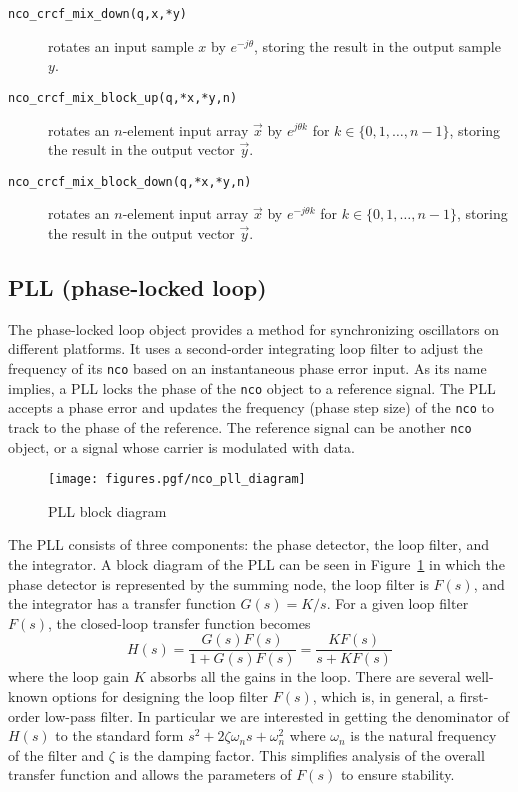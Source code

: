 \begin{description}
\item[{\tt nco\_crcf\_mix\_down(q,x,*y)}]
    rotates an input sample $x$ by $e^{-j\theta}$, storing the result in
    the output sample $y$.
\item[{\tt nco\_crcf\_mix\_block\_up(q,*x,*y,n)}]
    rotates an $n$-element input array $\vec{x}$ by $e^{j\theta k}$
    for $k \in \{0,1,\ldots,n-1\}$, storing the result in
    the output vector $\vec{y}$.
\item[{\tt nco\_crcf\_mix\_block\_down(q,*x,*y,n)}]
    rotates an $n$-element input array $\vec{x}$ by $e^{-j\theta k}$
    for $k \in \{0,1,\ldots,n-1\}$, storing the result in
    the output vector $\vec{y}$.
\end{description}

\subsection{PLL (phase-locked loop)}
\label{module:nco:pll}
The phase-locked loop object provides a method for synchronizing oscillators
on different platforms.
It uses a second-order integrating loop filter to adjust the frequency of its
{\tt nco} based on an instantaneous phase error input.
As its name implies, a PLL locks the phase of the {\tt nco} object to a
reference signal.
The PLL accepts a phase error and updates the frequency (phase step size) of
the {\tt nco} to track to the phase of the reference.
The reference signal can be another {\tt nco} object, or a signal whose
carrier is modulated with data.
%
\begin{figure}
\centering
  \texttt{[image: figures.pgf/nco\_pll\_diagram]}
\caption{PLL block diagram}
\label{fig:module:nco:pll_diagram}
\end{figure}
%
The PLL consists of three components: the phase detector, the loop filter, and
the integrator.
A block diagram of the PLL can be seen in
Figure~\ref{fig:module:nco:pll_diagram} in which the phase detector is
represented by the summing node, the loop filter is $F(s)$, and the integrator
has a transfer function $G(s) = K/s$.
For a given loop filter $F(s)$, the closed-loop transfer function becomes
%
\begin{equation}
    H(s) = \frac{ G(s)F(s) }{ 1 + G(s)F(s) }
         = \frac{ KF(s)    }{ s + KF(s)    }
\end{equation}
%
where the loop gain $K$ absorbs all the gains in the loop.
%
There are several well-known options for designing the loop filter $F(s)$,
which is, in general, a first-order low-pass filter.
In particular we are interested in getting the denominator of $H(s)$ to the
standard form $s^2 + 2\zeta\omega_n s + \omega_n^2$ where $\omega_n$ is the
natural frequency of the filter and $\zeta$ is the damping factor.
This simplifies analysis of the overall transfer function and allows the
parameters of $F(s)$ to ensure stability.


